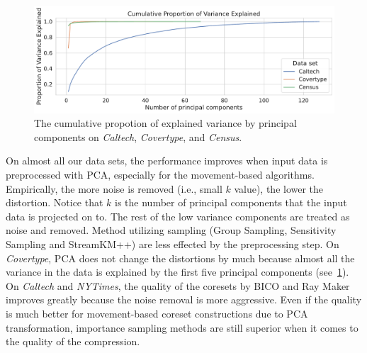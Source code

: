 \begin{figure}
  \caption{The cumulative propotion of explained variance by principal components on \textit{Caltech}, \textit{Covertype}, and \textit{Census}.}
  \label{fig:explained-variance-pca}
  \includegraphics[width=0.9\linewidth]{figures/explained-variance-plot.pdf}
\end{figure}

On almost all our data sets, the performance improves when input data is preprocessed with PCA, especially for the movement-based algorithms. Empirically, the more noise is removed (i.e., small $k$ value), the lower the distortion. Notice that $k$ is the number of principal components that the input data is projected on to. The rest of the low variance components are treated as noise and removed. Method utilizing sampling (Group Sampling, Sensitivity Sampling and StreamKM++) are less effected by the preprocessing step. On \textit{Covertype}, PCA does not change the distortions by much because almost all the variance in the data is explained by the first five principal components (see~\cref{fig:explained-variance-pca}). 
On \textit{Caltech} and \textit{NYTimes}, the quality of the coresets by BICO and Ray Maker improves greatly because the noise removal is more aggressive. Even if the quality is much better for movement-based coreset constructions due to PCA transformation, importance sampling methods are still superior when it comes to the quality of the compression. 

